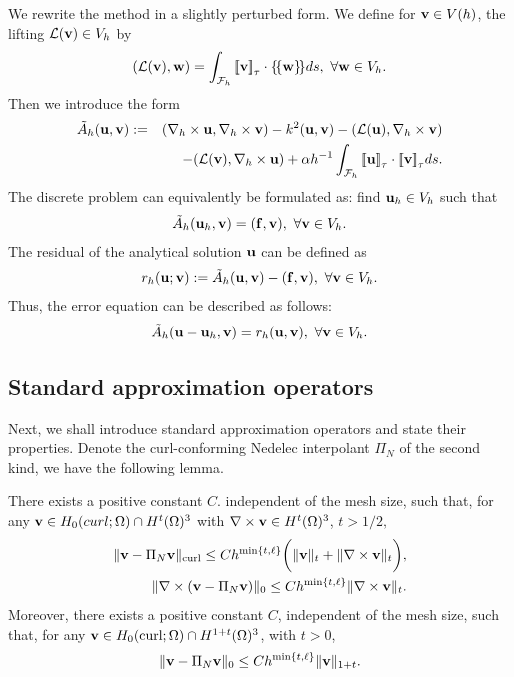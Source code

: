 \documentclass[final,leqno]{siamltex704}
\newcommand{\bv}{{\bf v}}
\def\bbf{{\bf f}}
\def\bu{{\bf u}}
\def\bv{{\bf v}}
\def\bw{{\bf w}}
\def\mL{{\mathcal L}}
\def\mF{\mathcal{F}}
\def\ljump{{[\![}}
\def\rjump{{]\!]}}
\def\lavg{{\{\!\{}}
\def\ravg{{\}\!\}}}
\begin{document}
We rewrite the method in a slightly perturbed form. We define for $\bv\in V(h)$, the lifting $\mL(\bv)\in V_h$ by
\begin{eqnarray*}
(\mL(\bv),\bw)=\int_{\mF_h}\ljump\bv\rjump_{\tau}\cdot\lavg\bw\ravg ds,\ \forall\bw\in V_h.
\end{eqnarray*}
Then we introduce the form
\begin{eqnarray*}
\tilde{A}_h(\bu,\bv):=&&(\nabla_h\times\bu,\nabla_h\times\bv)-k^2(\bu,\bv)-(\mL(\bu),\nabla_h\times\bv)\\
&&-(\mL(\bv),\nabla_h\times\bu)+\alpha h^{-1}\int_{\mF_h}\ljump\bu\rjump_{\tau}\cdot\ljump\bv\rjump_{\tau}ds.
\end{eqnarray*}
The discrete problem can equivalently be formulated as: find $\bu_h\in V_h$ such that
\begin{eqnarray}
\tilde{A}_h(\bu_h,\bv)=(\bbf,\bv),\ \forall \bv\in V_h.
\end{eqnarray}
The residual of the analytical solution $\bu$ can be defined as
\begin{eqnarray}
r_h(\bu;\bv):=\tilde{A}_h(\bu,\bv)-(\bbf,\bv),\ \forall\bv\in V_h.
\end{eqnarray}
Thus, the error equation can be described as follows:
\begin{eqnarray}
\tilde{A}_h(\bu-\bu_h,\bv)=r_h(\bu,\bv),\ \forall \bv\in V_h.
\end{eqnarray}

\subsection{Standard approximation operators}
Next, we shall introduce standard approximation operators and state their properties. Denote the curl-conforming Nedelec interpolant $\Pi_N$ of the second kind, we have the following lemma.
\begin{lemma}
There exists a positive constant $C$. independent of the mesh size, such that, for any $\bv\in H_0(curl;\Omega)\cap H^t(\Omega)^3$ with $\nabla\times\bv\in H^t(\Omega)^3$, $t>1/2,$
\begin{eqnarray}
\|\bv-\Pi_N\bv\|_{\text{curl}}\le Ch^{\min\{t,\ell\}}\bigg(\|\bv\|_t+\|\nabla\times\bv\|_t\bigg),\\
\|\nabla\times(\bv-\Pi_N\bv)\|_0\le Ch^{\min\{t,\ell\}}\|\nabla\times\bv\|_t.
\end{eqnarray}
Moreover, there exists a positive constant $C$, independent of the mesh size, such that, for any $\bv\in H_0(\text{curl};\Omega)\cap H^{1+t}(\Omega)^3$, with $t>0$,
\begin{eqnarray}
\|\bv-\Pi_N\bv\|_0\le Ch^{\min\{t,\ell\}}\|\bv\|_{1+t}.
\end{eqnarray}
\end{lemma}
\end{document}
